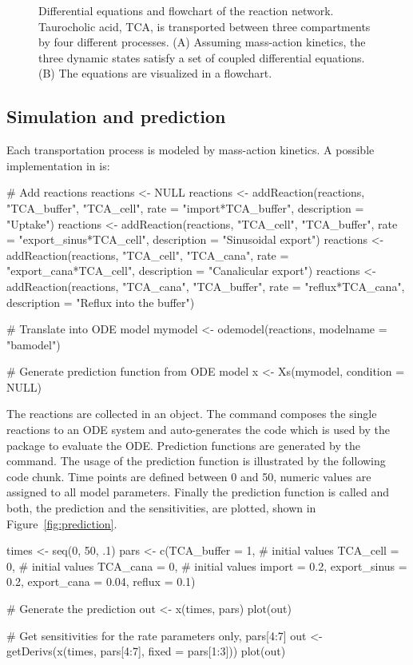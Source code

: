 \documentclass[article]{jss}
\begin{document}
\begin{figure}[ht]
\begin{minipage}{0.44\textwidth}
	\end{minipage}
	\caption{Differential equations and flowchart of the reaction network. Taurocholic acid,  TCA, is transported between three compartments by four different processes. (A) Assuming mass-action kinetics, the three dynamic states satisfy a set of coupled differential equations. (B) The equations are visualized in a flowchart. }
	\label{fig:flowchart}
\end{figure}

\subsection{Simulation and prediction}

Each transportation process is modeled by mass-action kinetics. A possible implementation in  is:
\begin{CodeChunk}
	\begin{CodeInput}
# Add reactions
reactions <- NULL
reactions <- addReaction(reactions, "TCA_buffer", "TCA_cell",
			 rate = "import*TCA_buffer",
			 description = "Uptake")
reactions <- addReaction(reactions, "TCA_cell", "TCA_buffer",
			 rate = "export_sinus*TCA_cell",
			 description = "Sinusoidal export")
reactions <- addReaction(reactions, "TCA_cell", "TCA_cana",
			 rate = "export_cana*TCA_cell",
			 description = "Canalicular export")
reactions <- addReaction(reactions, "TCA_cana", "TCA_buffer",
			 rate = "reflux*TCA_cana",
			 description = "Reflux into the buffer")

# Translate into ODE model
mymodel <- odemodel(reactions, modelname = "bamodel")

# Generate prediction function from ODE model
x <- Xs(mymodel, condition = NULL)
	\end{CodeInput}
\end{CodeChunk}
The reactions are collected in an  object. The  command composes the single reactions to an ODE system and auto-generates the  code which is used by the  package to evaluate the ODE. Prediction functions are generated by the  command. The usage of the prediction function is illustrated by the following code chunk. Time points are defined between 0 and 50, numeric values are assigned to all model parameters. Finally the prediction function is called and both, the prediction and the sensitivities, are plotted, shown in Figure~\ref{fig:prediction}.

\begin{CodeChunk}
\begin{CodeInput}
times <- seq(0, 50, .1)
pars <- c(TCA_buffer = 1,          # initial values
          TCA_cell = 0,            # initial values
	  TCA_cana = 0,            # initial values
	  import = 0.2,
	  export_sinus = 0.2,
	  export_cana = 0.04,
	  reflux = 0.1)

# Generate the prediction
out <- x(times, pars)
plot(out)

# Get sensitivities for the rate parameters only, pars[4:7]
out <- getDerivs(x(times, pars[4:7], fixed = pars[1:3]))
plot(out)
\end{CodeInput}
\end{CodeChunk}
\end{document}
